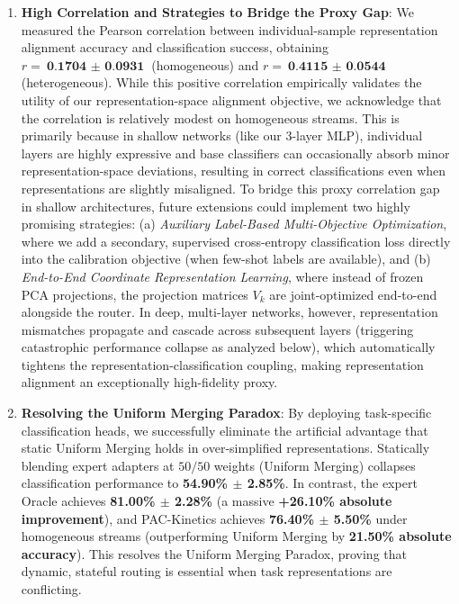\begin{enumerate}
    \item \textbf{High Correlation and Strategies to Bridge the Proxy Gap}: We measured the Pearson correlation between individual-sample representation alignment accuracy and classification success, obtaining $r = \textbf{0.1704 $\pm$ 0.0931}$ (homogeneous) and $r = \textbf{0.4115 $\pm$ 0.0544}$ (heterogeneous). While this positive correlation empirically validates the utility of our representation-space alignment objective, we acknowledge that the correlation is relatively modest on homogeneous streams. This is primarily because in shallow networks (like our 3-layer MLP), individual layers are highly expressive and base classifiers can occasionally absorb minor representation-space deviations, resulting in correct classifications even when representations are slightly misaligned.
    To bridge this proxy correlation gap in shallow architectures, future extensions could implement two highly promising strategies: (a) \emph{Auxiliary Label-Based Multi-Objective Optimization}, where we add a secondary, supervised cross-entropy classification loss directly into the calibration objective (when few-shot labels are available), and (b) \emph{End-to-End Coordinate Representation Learning}, where instead of frozen PCA projections, the projection matrices $V_k$ are joint-optimized end-to-end alongside the router. In deep, multi-layer networks, however, representation mismatches propagate and cascade across subsequent layers (triggering catastrophic performance collapse as analyzed below), which automatically tightens the representation-classification coupling, making representation alignment an exceptionally high-fidelity proxy.
    \item \textbf{Resolving the Uniform Merging Paradox}: By deploying task-specific classification heads, we successfully eliminate the artificial advantage that static Uniform Merging holds in over-simplified representations. Statically blending expert adapters at $50/50$ weights (Uniform Merging) collapses classification performance to \textbf{54.90\% $\pm$ 2.85\%}. In contrast, the expert Oracle achieves \textbf{81.00\% $\pm$ 2.28\%} (a massive \textbf{+26.10\% absolute improvement}), and \textsf{PAC-Kinetics} achieves \textbf{76.40\% $\pm$ 5.50\%} under homogeneous streams (outperforming Uniform Merging by \textbf{21.50\% absolute accuracy}). This resolves the Uniform Merging Paradox, proving that dynamic, stateful routing is essential when task representations are conflicting.

\end{enumerate}

